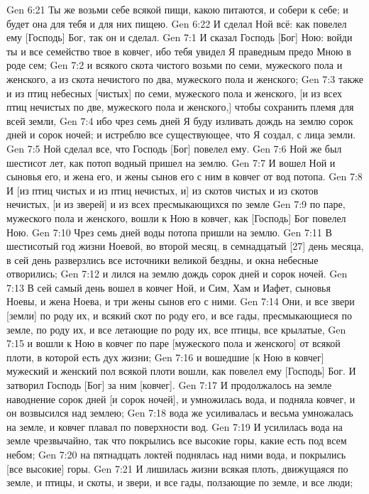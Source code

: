 \vs Gen 6:21 Ты же возьми себе всякой пищи, какою питаются, и собери к себе; и будет она для тебя и для них пищею.
\vs Gen 6:22 И сделал Ной всё: как повелел ему [Господь] Бог, так он и сделал.
\vs Gen 7:1 И сказал Господь [Бог] Ною: войди ты и все семейство твое в ковчег, ибо тебя увидел Я праведным предо Мною в роде сем;
\vs Gen 7:2 и всякого скота чистого возьми по семи, мужеского пола и женского, а из скота нечистого по два, мужеского пола и женского;
\vs Gen 7:3 также и из птиц небесных [чистых] по семи, мужеского пола и женского, [и из всех птиц нечистых по две, мужеского пола и женского,] чтобы сохранить племя для всей земли,
\vs Gen 7:4 ибо чрез семь дней Я буду изливать дождь на землю сорок дней и сорок ночей; и истреблю все существующее, что Я создал, с лица земли.
\vs Gen 7:5 Ной сделал все, что Господь [Бог] повелел ему.
\rsbpar\vs Gen 7:6 Ной же был шестисот лет, как потоп водный пришел на землю.
\vs Gen 7:7 И вошел Ной и сыновья его, и жена его, и жены сынов его с ним в ковчег от вод потопа.
\vs Gen 7:8 И [из птиц чистых и из птиц нечистых, и] из скотов чистых и из скотов нечистых, [и из зверей] и из всех пресмыкающихся по земле
\vs Gen 7:9 по паре, мужеского пола и женского, вошли к Ною в ковчег, как [Господь] Бог повелел Ною.
\rsbpar\vs Gen 7:10 Чрез семь дней воды потопа пришли на землю.
\vs Gen 7:11 В шестисотый год жизни Ноевой, во второй месяц, в семнадцатый [27] день месяца, в сей день разверзлись все источники великой бездны, и окна небесные отворились;
\vs Gen 7:12 и лился на землю дождь сорок дней и сорок ночей.
\vs Gen 7:13 В сей самый день вошел в ковчег Ной, и Сим, Хам и Иафет, сыновья Ноевы, и жена Ноева, и три жены сынов его с ними.
\vs Gen 7:14 Они, и все звери [земли] по роду их, и всякий скот по роду его, и все гады, пресмыкающиеся по земле, по роду их, и все летающие по роду их, все птицы, все крылатые,
\vs Gen 7:15 и вошли к Ною в ковчег по паре [мужеского пола и женского] от всякой плоти, в которой есть дух жизни;
\vs Gen 7:16 и вошедшие [к Ною в ковчег] мужеский и женский пол всякой плоти вошли, как повелел ему [Господь] Бог. И затворил Господь [Бог] за ним [ковчег].
\vs Gen 7:17 И продолжалось на земле наводнение сорок дней [и сорок ночей], и умножилась вода, и подняла ковчег, и он возвысился над землею;
\vs Gen 7:18 вода же усиливалась и весьма умножалась на земле, и ковчег плавал по поверхности вод.
\vs Gen 7:19 И усилилась вода на земле чрезвычайно, так что покрылись все высокие горы, какие есть под всем небом;
\vs Gen 7:20 на пятнадцать локтей поднялась над ними вода, и покрылись [все высокие] горы.
\vs Gen 7:21 И лишилась жизни всякая плоть, движущаяся по земле, и птицы, и скоты, и звери, и все гады, ползающие по земле, и все люди;
